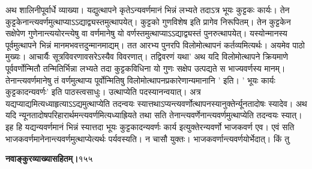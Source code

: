 \documentclass[11pt, openany]{book}
\begin{document}
\begin{sloppypar}
\hangindent=0.2in \hspace{0.2in}अथ शालिनीपूर्वार्धे व्याख्या। यद्युत्थापने कृतेऽन्यवर्णमानं भिन्नं लभ्यते तदाऽत्र भूयः कुट्टकः कार्यः। तेन कुट्टकेनान्त्यवर्णमुत्थाप्याऽऽद्याद्व्यस्तमुत्थापयेत्। कुट्टको गुणविशेष इति प्रागेव निरूपितम्। तेन कुट्टकेन सक्षेपेण गुणेनान्त्ययोरन्त्येषु वा वर्णमानेषु यो वर्णस्तमुत्थाप्याऽऽद्याद्व्यस्तं पुनरुत्थापयेत्। यस्योन्मानस्य पूर्वमुत्थापने भिन्नं मानमभवत्तदुन्मानमाद्यम्। तत आरभ्य पुनरपि विलोमोत्थापनं कर्तव्यमित्यर्थः। अयमेव पाठो मुख्यः। आचार्यैः सूत्रविवरणावसरेऽस्यैव विवरणात्। तद्विवरणं यथा\textendash ' अथ यदि विलोमोत्थापने क्रियमाणे पूर्ववर्णोन्मितौ तन्मितिर्भिन्ना लभ्यते तदा कुट्टकविधिना यो गुणः सक्षेप उत्पद्यते स भाज्यवर्णस्य मानम्। तेनान्त्यवर्णमानेषु तं वर्णमुत्थाप्य पूर्वोन्मितिषु विलोमोत्थापनप्रकारेणान्यमानानि ' इति। ' भूयः कार्यः कुट्टकादन्यवर्णः' इति पाठस्त्वसाधुः। उत्थाप्येति पदस्यानन्वयात्। अत्र यद्यप्याद्यमित्यध्याहृत्याऽऽद्यमुत्थाप्येति तदन्वयः स्यात्तथाऽप्यन्त्यवर्णोत्थापनस्यानुक्तेर्न्यूनतादोषः स्यादेव। अथ यदि न्यूनतादोषपरिहारार्थमन्त्यवर्णमित्यध्याह्रियते तथा सति तेनान्त्यवर्णेनान्त्यवर्णमुत्थाप्येति तदन्वयः स्यात्। इह हि यद्यन्यवर्णमानं भिन्नं स्यात्तदा भूयः कुट्टकादन्यवर्णः कार्य इत्युक्तेरन्यवर्णो भाजकवर्ण एव। एवं सति भाजकवर्णमानेनान्त्यवर्णमुत्थाप्येत्यर्थः पर्यवस्यति। न चासौ युक्तः। भाजकवर्णान्त्यवर्णयोर्भेदात्। किं तु
\end{sloppypar}
\thispagestyle{empty}
\newpage

\onehalfspacing
\hspace{2in}\textbf{नवाङ्कुरव्याख्यासहितम्।}\hspace{2in}१५५

\vspace{5mm}
\end{document}
